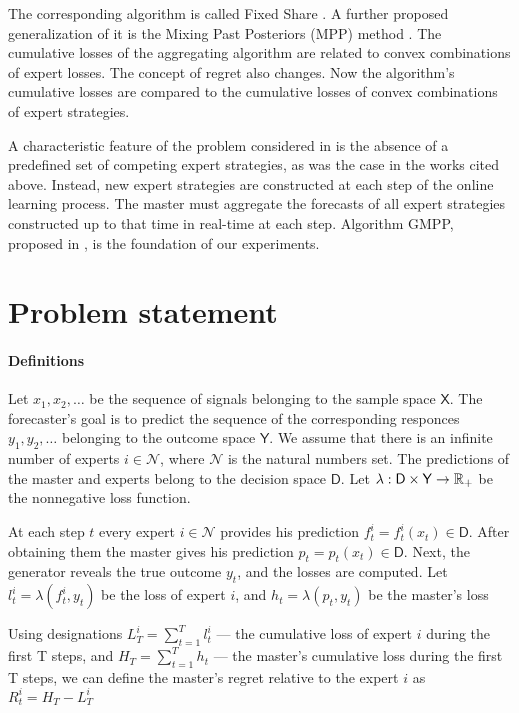 \documentclass[12pt, twoside]{article}
\begin{document}
The corresponding algorithm is called Fixed Share \cite{article98}. A further proposed generalization of it is the Mixing Past Posteriors (MPP) method \cite{article02}. The cumulative losses of the aggregating algorithm are related to convex combinations of expert losses. The concept of regret also changes. Now the algorithm's cumulative losses are compared to the cumulative losses of convex combinations of expert strategies.

A characteristic feature of the problem considered in \cite{article} is the absence of a predefined set of competing expert strategies, as was the case in the works cited above. Instead, new expert strategies are constructed at each step of the online learning process. The master must aggregate the forecasts of all expert strategies constructed up to that time in real-time at each step. Algorithm GMPP, proposed in \cite{article}, is the foundation of our experiments. 

\section{Problem statement}
\paragraph{Definitions}
Let $x_1, x_2, \dots$ be the sequence of signals belonging to the sample space  $\mathsf{X}$. 
The forecaster's goal is to predict the sequence of the corresponding responces $y_1, y_2, \dots$ belonging to the outcome space $\mathsf{Y}$. 
We assume that there is an infinite number of experts $i \in \mathcal{N}$, where $\mathcal{N}$ is the natural numbers set. 
The predictions of the master and experts belong to the decision space $\mathsf{D}$. 
Let $ \lambda: \mathsf{D} \times \mathsf{Y} \rightarrow \RR_+$ be the nonnegative loss function. 

At each step $t$ every expert $i \in \mathcal{N}$ provides his prediction $f_t^i = f_t^i(x_t)  \in \mathsf{D}$. 
After obtaining them the master gives his prediction $p_t = p_t(x_t) \in \mathsf{D}$. 
Next, the generator reveals the true outcome $y_t$, and the losses are computed.
Let $l_t^i = \lambda(f_t^i, y_t)$ be the loss of expert $i$, and $h_t = \lambda(p_t, y_t)$ be the master's loss 

Using designations $L_T^i = \sum_{t = 1}^T l_t^i$ --- the cumulative loss of expert $i$ during the first T steps, and $H_T = \sum_{t = 1}^T h_t$ --- the master's cumulative loss during the first T steps, we can define the master's regret relative to the expert $i$ as $R^i_t = H_T - L^i_T$
\end{document}
